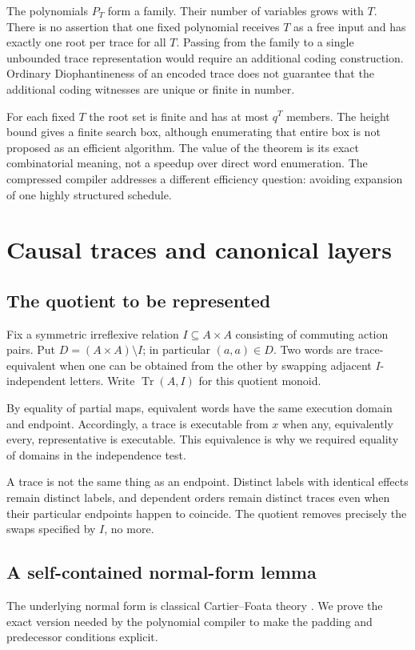 \documentclass[11pt,a4paper]{article}
\theoremstyle{definition}
\theoremstyle{remark}
\newcommand{\Tr}{\operatorname{Tr}}
\newcommand{\srctag}[1]{\texorpdfstring{\hspace{0.5em}{\normalfont\small\color{accent}[#1]}}{ [#1]}}
\begin{document}
The polynomials $P_T$ form a family. Their number of variables grows with $T$.
There is no assertion that one fixed polynomial receives $T$ as a free input
and has exactly one root per trace for all $T$. Passing from the family to a
single unbounded trace representation would require an additional coding
construction. Ordinary Diophantineness of an encoded trace does not guarantee
that the additional coding witnesses are unique or finite in number.

For each fixed $T$ the root set is finite and has at most $q^T$ members. The
height bound gives a finite search box, although enumerating that entire box
is not proposed as an efficient algorithm. The value of the theorem is its
exact combinatorial meaning, not a speedup over direct word enumeration.
The compressed compiler addresses a different efficiency question: avoiding
expansion of one highly structured schedule.


\section{Causal traces and canonical layers\srctag{01}}\label{cdc:ct:sec:traces}
\subsection{The quotient to be represented}
Fix a symmetric irreflexive relation $I\subseteq A\times A$ consisting of commuting action pairs. Put $D=(A\times A)\setminus I$; in particular $(a,a)\in D$. Two words are trace-equivalent when one can be obtained from the other by swapping adjacent $I$-independent letters. Write $\Tr(A,I)$ for this quotient monoid.

By equality of partial maps, equivalent words have the same execution domain and endpoint. Accordingly, a trace is executable from $x$ when any, equivalently every, representative is executable. This equivalence is why we required equality of domains in the independence test.

A trace is not the same thing as an endpoint. Distinct labels with identical effects remain distinct labels, and dependent orders remain distinct traces even when their particular endpoints happen to coincide. The quotient removes precisely the swaps specified by $I$, no more.

\subsection{A self-contained normal-form lemma}
The underlying normal form is classical Cartier--Foata theory \cite{cartier-foata,krattenthaler}. We prove the exact version needed by the polynomial compiler to make the padding and predecessor conditions explicit.
\end{document}
